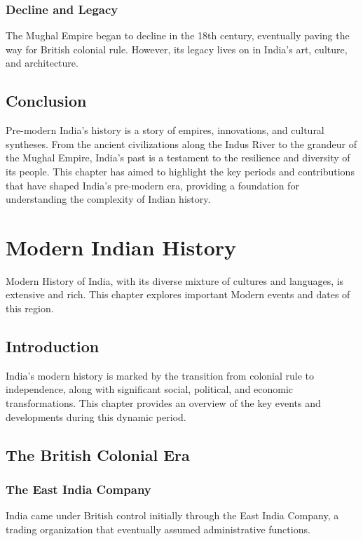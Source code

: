 \documentclass[a4paper,12pt]{book}
\begin{document}
\subsection{Decline and Legacy}
The Mughal Empire began to decline in the 18th century, eventually paving the way for British colonial rule. However, its legacy lives on in India’s art, culture, and architecture.

\section{Conclusion}
\label{sec:conclusion-pre-modern-india}
Pre-modern India’s history is a story of empires, innovations, and cultural syntheses. From the ancient civilizations along the Indus River to the grandeur of the Mughal Empire, India’s past is a testament to the resilience and diversity of its people. This chapter has aimed to highlight the key periods and contributions that have shaped India’s pre-modern era, providing a foundation for understanding the complexity of Indian history.

\chapter{Modern Indian History}
\label{ch:modern-indian-history}

Modern History of India, with its diverse mixture of cultures and languages, is extensive and rich. This chapter explores important Modern events and dates of this region.

\section{Introduction}
\label{sec:introduction-modern-india}
India’s modern history is marked by the transition from colonial rule to independence, along with significant social, political, and economic transformations. This chapter provides an overview of the key events and developments during this dynamic period.

\section{The British Colonial Era}
\label{sec:british-colonial-era}

\subsection{The East India Company}
India came under British control initially through the East India Company, a trading organization that eventually assumed administrative functions.
\end{document}
